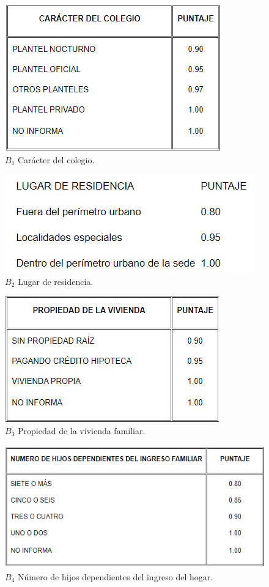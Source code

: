 \documentclass[
]{book}
\begin{document}
\begin{figure}
 
 {\centering \includegraphics[width=0.5\linewidth]{ProtectoR/b1} 
 
 }
 
 \caption{$B_1$ Carácter del colegio.}\label{fig:unnamed-chunk-15}
 \end{figure}
 \begin{figure}
 
 {\centering \includegraphics[width=0.5\linewidth]{ProtectoR/b2n} 
 
 }
 
 \caption{$B_2$ Lugar de residencia. }\label{fig:unnamed-chunk-16}
 \end{figure}
\begin{figure}

{\centering \includegraphics[width=0.5\linewidth]{ProtectoR/b3} 

}

\caption{$B_3$ Propiedad de la vivienda familiar.}\label{fig:unnamed-chunk-17}
\end{figure}

\begin{figure}

{\centering \includegraphics[width=0.5\linewidth]{ProtectoR/b4} 

}

\caption{$B_4$ Número de hijos dependientes del ingreso del hogar.}\label{fig:unnamed-chunk-18}
\end{figure}
\end{document}
